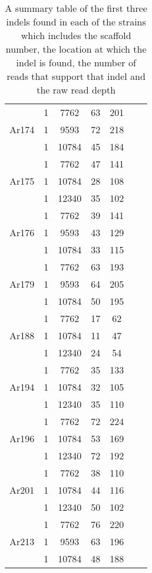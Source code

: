 \documentclass{report}
\begin{document}
\begin{table}[H]
\begin{center}
\begin{tabular}{ |c|c|c|c|c|c|c| }
		\hline
		\multirow{3}{4em}{Ar174} & 1 & 7762 & 63 & 201 \\ 
		& 1 & 9593 & 72 & 218  \\ 
		& 1 & 10784 & 45 & 184 \\ 
		\hline
		\multirow{3}{4em}{Ar175} & 1 & 7762 & 47 & 141 \\ 
		& 1 & 10784 & 28 & 108  \\ 
		& 1 & 12340 & 35 & 102 \\ 
		\hline
		\multirow{3}{4em}{Ar176} & 1 & 7762 & 39 & 141 \\ 
		& 1 & 9593 & 43 & 129  \\ 
		& 1 & 10784 & 33 & 115 \\ 
		\hline
		\multirow{3}{4em}{Ar179} & 1 & 7762 & 63 & 193 \\ 
		& 1 & 9593 & 64 & 205  \\ 
		& 1 & 10784 & 50 & 195 \\ 
		\hline
		\multirow{3}{4em}{Ar188} & 1 & 7762 & 17 & 62 \\ 
		& 1 & 10784 & 11 & 47  \\ 
		& 1 & 12340 & 24 & 54 \\ 
		\hline
		\multirow{3}{4em}{Ar194} & 1 & 7762 & 35 & 133 \\ 
		& 1 & 10784 & 32 & 105  \\ 
		& 1 & 12340 & 35 & 110 \\ 
		\hline
		\multirow{3}{4em}{Ar196} & 1 & 7762 & 72 & 224 \\ 
		& 1 & 10784 & 53 & 169  \\ 
		& 1 & 12340 & 72 & 192 \\ 
		\hline
		\multirow{3}{4em}{Ar201} & 1 & 7762 & 38 & 110 \\ 
		& 1 & 10784 & 44 & 116  \\ 
		& 1 & 12340 & 50 & 102 \\ 
		\hline
		\multirow{3}{4em}{Ar213} & 1 & 7762 & 76 & 220 \\ 
		& 1 & 9593 & 63 & 196  \\ 
		& 1 & 10784 & 48 & 188 \\ 
		\hline
	\end{tabular}
\end{center}
\caption{A summary table of the first three indels found in each of the strains which includes the scaffold number, the location at which the indel is found, the number of reads that support that indel and the raw read depth}
\end{table}
\end{document}
